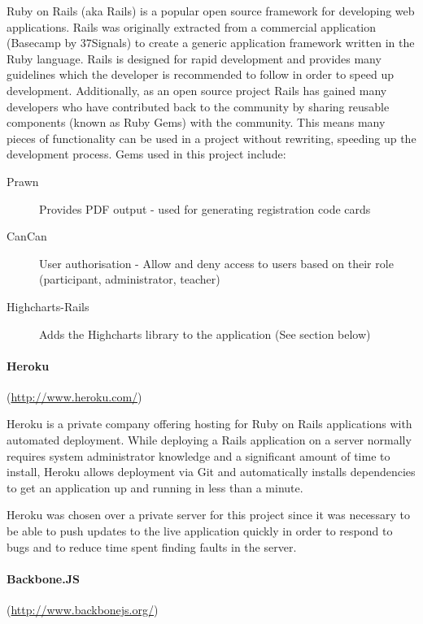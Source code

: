 Ruby on Rails (aka Rails) is a popular open source framework for developing web applications\cite{bachle_ruby_2007}.
Rails was originally extracted from a commercial application (Basecamp by 37Signals) to create a generic
application framework \cite{carneiro_jr._beginning_2010} written in the Ruby language. Rails is designed for
rapid development and provides many guidelines which the developer is recommended to follow in order to speed up
development. Additionally, as an open source project Rails has gained many developers who have contributed back
to the community by sharing reusable components (known as Ruby Gems) with the community. This means many pieces of
functionality can be used in a project without rewriting, speeding up the development process. Gems used in this
project include:
\begin{description}
\item[Prawn] Provides PDF output - used for generating registration code cards
\item[CanCan] User authorisation - Allow and deny access to users based on their role (participant, administrator, teacher)
\item[Highcharts-Rails] Adds the Highcharts library to the application (See section below)
\end{description}


\paragraph{Heroku}
(\url{http://www.heroku.com/})

Heroku is a private company offering hosting for Ruby on Rails applications with automated deployment. While deploying
a Rails application on a server normally requires system administrator knowledge and a significant amount of
time to install, Heroku
allows deployment via Git and automatically installs dependencies to get an application up and running in less
than a minute.

Heroku was chosen over a private server for this project since it was necessary to be able to push updates
to the live application quickly in order to respond to bugs and to reduce time spent finding faults in the server.


\paragraph{Backbone.JS}
(\url{http://www.backbonejs.org/})

